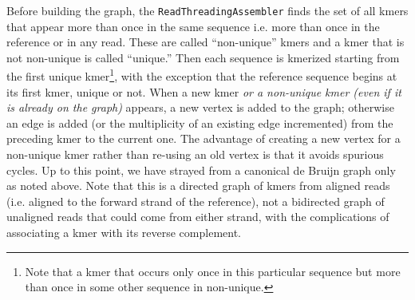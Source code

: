 \documentclass[nofootinbib,amssymb,amsmath]{revtex4}
\newcommand{\code}[1]{\texttt{#1}}
\begin{document}
Before building the graph, the \code{ReadThreadingAssembler} finds the set of all kmers that appear more than once in the same sequence i.e. more than once in the reference or in any read.  These are called ``non-unique'' kmers and a kmer that is not non-unique is called ``unique.''  Then each sequence is kmerized starting from the first unique kmer\footnote{Note that a kmer that occurs only once in this particular sequence but more than once in some other sequence in non-unique.}, with the exception that the reference sequence begins at its first kmer, unique or not.  When a new kmer \textit{or a non-unique kmer (even if it is already on the graph)} appears, a new vertex is added to the graph; otherwise an edge is added (or the multiplicity of an existing edge incremented) from the preceding kmer to the current one.  The advantage of creating a new vertex for a non-unique kmer rather than re-using an old vertex is that it avoids spurious cycles.  Up to this point, we have strayed from a canonical de Bruijn graph only as noted above.  Note that this is a directed graph of kmers from aligned reads (i.e. aligned to the forward strand of the reference), not a bidirected graph of unaligned reads that could come from either strand, with the complications of associating a kmer with its reverse complement.
\end{document}
